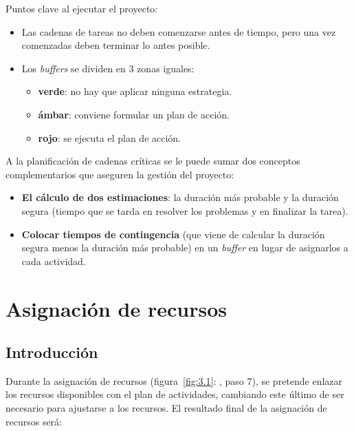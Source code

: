 \documentclass[12pt]{article}
\begin{document}
{Puntos clave al ejecutar el proyecto:}

\begin{itemize}
    \item {Las cadenas de tareas no deben comenzarse antes de tiempo, pero una vez comenzadas deben terminar lo antes posible.}
    \item {Los \textit{buffers} se dividen en 3 zonas iguales:}
    
    \begin{itemize}
        \item {\textbf{verde}: no hay que aplicar ninguna estrategia.}
        \item {\textbf{ámbar}: conviene formular un plan de acción.}
        \item {\textbf{rojo}: se ejecuta el plan de acción.}
    \end{itemize}
\end{itemize}

{A la planificación de cadenas críticas se le puede sumar dos conceptos complementarios que aseguren la gestión del proyecto:}

\begin{itemize}
    \item {\textbf{El cálculo de dos estimaciones}: la duración más probable y la duración segura (tiempo que se tarda en resolver los problemas y en finalizar la tarea).}
    \item {\textbf{Colocar tiempos de contingencia} (que viene de calcular la duración segura menos la duración más probable) en un \textit{buffer} en lugar de asignarlos a cada actividad.}
\end{itemize}


\newpage
\section{Asignación de recursos}
\label{8.0.0}

\subsection{Introducción}
\label{8.1.0}

{Durante la asignación de recursos (figura~\ref{fig:3.1}: , paso 7), se pretende enlazar los recursos disponibles con el plan de actividades, cambiando este último de ser necesario para ajustarse a los recursos. El resultado final de la asignación de recursos será:}
\end{document}
